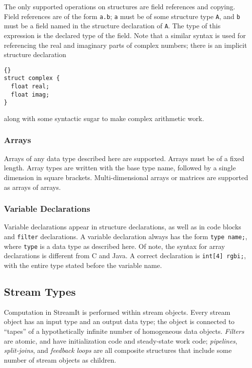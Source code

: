 \documentclass[11pt]{article}
\begin{document}
The only supported operations on structures are field references and
copying.  Field references are of the form \lstinline|a.b|; \lstinline|a| must
be of some structure type \lstinline|A|, and \lstinline|b| must be a field named
in the structure declaration of \lstinline|A|.  The type of this expression
is the declared type of the field.  Note that a similar syntax is used
for referencing the real and imaginary parts of complex numbers; there
is an implicit structure declaration

\begin{lstlisting}{}
struct complex {
  float real;
  float imag;
}
\end{lstlisting}{}

\noindent
along with some syntactic sugar to make complex arithmetic work.

\subsubsection{Arrays}

Arrays of any data type described here are supported.  Arrays must be
of a fixed length.  Array types are written with the base type name,
followed by a single dimension in square brackets.  Multi-dimensional
arrays or matrices are supported as arrays of arrays.

\subsubsection{Variable Declarations}

Variable declarations appear in structure declarations, as well as in
code blocks and \lstinline|filter| declarations.  A variable declaration
always has the form \lstinline|type name;|, where \lstinline|type| is a data
type as described here.  Of note, the syntax for array declarations is
different from C and Java.  A correct declaration is
\lstinline|int[4] rgbi;|, with the entire type stated before the variable name.


\subsection{Stream Types}

Computation in StreamIt is performed within stream objects.  Every
stream object has an input type and an output data type; the object is
connected to ``tapes'' of a hypothetically infinite number of
homogeneous data objects.  \emph{Filters} are atomic, and have
initialization code and steady-state work code; \emph{pipelines},
\emph{split-joins}, and \emph{feedback loops} are all composite
structures that include some number of stream objects as children.
\end{document}
